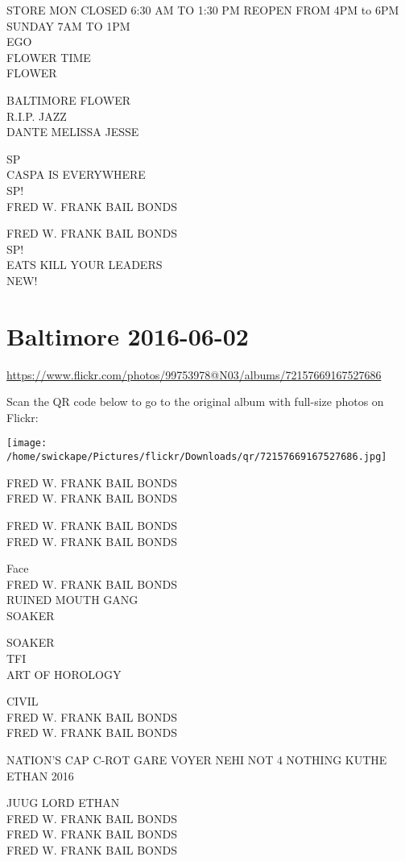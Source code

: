 \documentclass[10pt,letterpaper]{article}
\begin{document}
STORE MON CLOSED 6:30 AM TO 1:30 PM REOPEN FROM 4PM to 6PM SUNDAY 7AM TO 1PM\\
EGO\\
FLOWER TIME\\
FLOWER

BALTIMORE FLOWER\\
R.I.P. JAZZ\\
DANTE MELISSA JESSE

SP\\
CASPA IS EVERYWHERE\\
SP!\\
FRED W. FRANK BAIL BONDS

FRED W. FRANK BAIL BONDS\\
SP!\\
EATS KILL YOUR LEADERS\\
NEW!
\pagebreak

\section*{Baltimore 2016-06-02}

\url{https://www.flickr.com/photos/99753978@N03/albums/72157669167527686}

Scan the QR code below to go to the original album with full-size photos on Flickr:

\texttt{[image: /home/swickape/Pictures/flickr/Downloads/qr/72157669167527686.jpg]}
\pagebreak

FRED W. FRANK BAIL BONDS\\
FRED W. FRANK BAIL BONDS

FRED W. FRANK BAIL BONDS\\
FRED W. FRANK BAIL BONDS

Face\\
FRED W. FRANK BAIL BONDS\\
RUINED MOUTH GANG\\
SOAKER

SOAKER\\
TFI\\
ART OF HOROLOGY

CIVIL\\
FRED W. FRANK BAIL BONDS\\
FRED W. FRANK BAIL BONDS

NATION'S CAP C{-}ROT GARE VOYER NEHI NOT 4 NOTHING KUTHE\\
ETHAN 2016

JUUG LORD ETHAN\\
FRED W. FRANK BAIL BONDS\\
FRED W. FRANK BAIL BONDS\\
FRED W. FRANK BAIL BONDS
\end{document}
